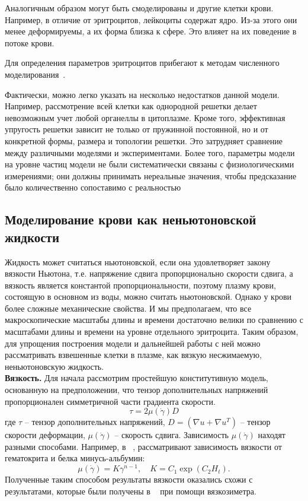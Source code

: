 Аналогичным образом могут быть смоделированы и другие клетки крови. Например, в отличие от эритроцитов, лейкоциты содержат ядро. Из-за этого они менее деформируемы, а их форма близка к сфере. Это влияет на их поведение в потоке крови.

Для определения параметров эритроцитов прибегают к методам численного моделирования~\cite{bessonov:2014}.

Фактически, можно легко указать на несколько недостатков данной модели. Например, рассмотрение всей клетки как однородной решетки делает невозможным учет любой органеллы в цитоплазме. Кроме того, эффективная упругость решетки зависит не только от пружинной постоянной, но и от конкретной формы, размера и топологии решетки. Это затрудняет сравнение между различными моделями и экспериментами. Более того, параметры модели на уровне частиц  модели не были систематически связаны с физиологическими измерениями; они должны принимать нереальные значения, чтобы предсказание было количественно сопоставимо с реальностью 


\subsection{Моделирование крови как неньютоновской жидкости}
Жидкость может считаться ньютоновской, если она удовлетворяет закону вязкости Ньютона, т.е. напряжение сдвига пропорционально скорости сдвига, а вязкость является константой пропорциональности, поэтому плазму крови, состоящую в основном из воды, можно считать ньютоновской. Однако у крови более сложные механические свойства. И мы предполагаем, что все макроскопические масштабы длины и времени достаточно велики по сравнению с масштабами длины и времени на уровне отдельного эритроцита. Таким образом, для упрощения построения модели и дальнейшей работы с ней можно рассматривать взвешенные клетки в плазме, как вязкую несжимаемую, неньютоновскую жидкость.\\

\textbf{Вязкость.}
Для начала рассмотрим простейшую конститутивную модель, основанную на предположении, что тензор дополнительных напряжений пропорционален
симметричной части градиента скорости.\\
$$\tau=2\mu (\dot{\gamma})D$$
где $\tau $ -- тензор дополнительных напряжений, $D=(\nabla u+\nabla u^T)$ -- тензор скорости деформации, $\mu (\dot{\gamma})$ -- скорость сдвига.
Зависимость $\mu (\dot{\gamma})$ находят разными способами. Например, в ~\cite{walburn:1976},   рассматривают зависимость вязкости от гематокрита и белка минусь-альбумин: \\
$$
\mu (\dot{\gamma})=K{\gamma}^{n-1},\quad  K=C_1 \exp (C_2 H_t).
$$
Полученные таким способом результаты вязкости оказались схожи с результатами, которые были получены в ~\cite{kim:2000} при помощи вязкозиметра.\\

